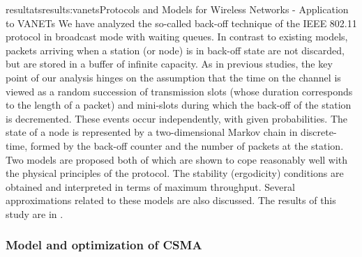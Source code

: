 \documentclass{ra2016}
\begin{document}
\begin{module}{resultats}{results:vanets}{Protocols and Models for Wireless Networks - Application to VANETs}
We have analyzed the so-called back-off technique of the IEEE 802.11 protocol
in broadcast mode with waiting queues. In contrast to existing models, packets arriving when a
station (or node) is in back-off state are not discarded, but are stored in a buffer of infinite capacity.
As in previous studies, the key point of our analysis hinges on the assumption that the time on
the channel is viewed as a random succession of transmission slots (whose duration corresponds
to the length of a packet) and mini-slots during which the back-off of the station is decremented.
These events occur independently, with given probabilities. The state of a node is represented by a
two-dimensional Markov chain in discrete-time, formed by the back-off counter and the number of
packets at the station. Two models are proposed both of which are shown to cope reasonably well
with the physical principles of the protocol. The stability (ergodicity) conditions are obtained and
interpreted in terms of maximum throughput. Several approximations related to these models are
also discussed. The results of this study are in \cite{fayolle:hal-01166082}. 


\subsubsection{Model and optimization of CSMA}

\begin{participants}
\end{participants}



\end{module}
\end{document}
